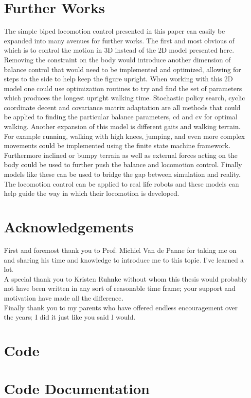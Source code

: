 \documentclass[12pt,a4paper]{article}
\begin{document}
\section{Further Works}
The simple biped locomotion control presented in this paper can easily be expanded into many avenues for further works. The first and most obvious of which is to control the motion in 3D instead of the 2D model presented here. Removing the constraint on the body would introduce another dimension of balance control that would need to be implemented and optimized, allowing for steps to the side to help keep the figure upright. When working with this 2D model one could use optimization routines to try and find the set of parameters which produces the longest upright walking time. Stochastic policy search, cyclic coordinate decent and covariance matrix adaptation are all methods that could be applied to finding the particular balance parameters, cd and cv for optimal walking. Another expansion of this model is different gaits and walking terrain. For example running, walking with high knees, jumping, and even more complex movements could be implemented using the finite state machine framework. Furthermore inclined or bumpy terrain as well as external forces acting on the body could be used to further push the balance and locomotion control. Finally models like these can be used to bridge the gap between simulation and reality. The locomotion control can be applied to real life robots and these models can help guide the way in which their locomotion is developed. 

\section{Acknowledgements}
First and foremost thank you to Prof. Michiel Van de Panne for taking me on and sharing his time and knowledge to introduce me to this topic. I've learned a lot.\\

A special thank you to Kristen Ruhnke without whom this thesis would probably not have been written in any sort of reasonable time frame; your support and motivation have made all the difference.\\

Finally thank you to my parents who have offered endless encouragement over the years; I did it just like you said I would.


\appendix
\section{Code}
\section{Code Documentation}

{}

\end{document}
